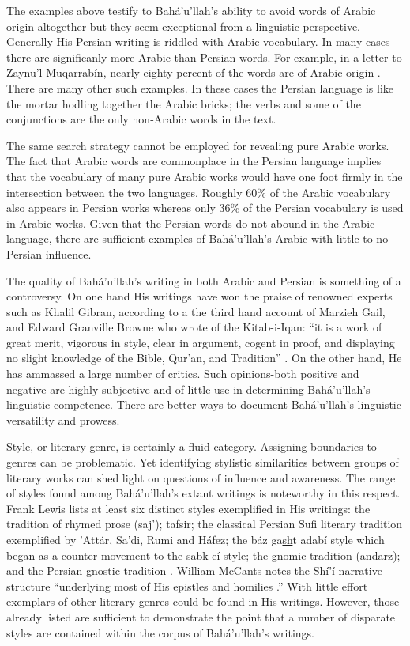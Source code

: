 \documentclass[12pt, oneside]{report}
\begin{document}
\par
The examples above testify to Bah\'{a}'u'llah's ability to avoid words of Arabic origin altogether but they seem exceptional from a linguistic perspective. Generally His Persian writing is riddled with Arabic vocabulary. In many cases there are significanly more Arabic than Persian words. For example, in a letter to Zaynu'l-Muqarrab\'{i}n, nearly eighty percent of the words are of Arabic origin \cite{bahaullah_muntakhabati-az_163}. There are many other such examples. In these cases the Persian language is like the mortar hodling together the Arabic bricks; the verbs and some of the conjunctions are the only non-Arabic words in the text.
\par
The same search strategy cannot be employed for revealing pure Arabic works. The fact that Arabic words are commonplace in the Persian language implies that the vocabulary of many pure Arabic works would have one foot firmly in the intersection between the two languages. Roughly 60\% of the Arabic vocabulary also appears in Persian works whereas only 36\% of the Persian vocabulary is used in Arabic works. Given that the Persian words do not abound in the Arabic language, there are sufficient examples of Bah\'{a}'u'llah's Arabic with little to no Persian influence.
\par
The quality of Bah\'{a}'u'llah's writing in both Arabic and Persian is something of a controversy. On one hand His writings have won the praise of renowned experts such as Khalil Gibran, according to a the third hand account of Marzieh Gail, \cite{gail_world_1978} and Edward Granville Browne who wrote of the Kitab-i-Iqan: ``it is a work of great merit, vigorous in style, clear in argument, cogent in proof, and displaying no slight knowledge of the Bible, Qur'an, and Tradition'' \cite{momen_selections_1987}. On the other hand, He has ammassed a large number of critics. Such opinions-both positive and negative-are highly subjective and of little use in determining Bah\'{a}'u'llah's linguistic competence. There are better ways to document Bah\'{a}'u'llah's linguistic versatility and prowess.
\par
Style, or literary genre, is certainly a fluid category.  Assigning boundaries to genres can be problematic. Yet identifying stylistic similarities between groups of literary works can shed light on questions of influence and awareness. The range of styles found among Bah\'{a}'u'llah's extant writings is noteworthy in this respect. Frank Lewis lists at least six distinct styles exemplified in His writings: the tradition of rhymed prose (saj'); tafsir; the classical Persian Sufi literary tradition exemplified by 'Att\'{a}r, Sa'di, Rumi and H\'{a}fez; the b\'{a}z ga\underline{sh}t adab\'{i} style which began as a counter movement to the sabk-e\'{i} style; the gnomic tradition (andarz); and the Persian gnostic tradition \cite{lewis_frank_scripture_1997}. William McCants notes the Sh\'{i}'\'{i} narrative structure ``underlying most of His epistles and homilies \cite{mccants_wronged_2002}.'' With little effort exemplars of other literary genres could be found in His writings. However, those already listed are sufficient to demonstrate the point that a number of disparate styles are contained within the corpus of Bah\'{a}'u'llah's writings.
\end{document}
